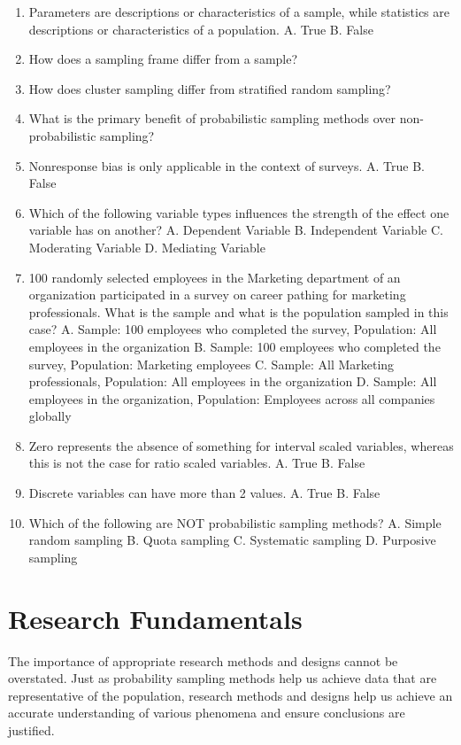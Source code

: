 \documentclass[]{book}
\begin{document}
\begin{enumerate}
\def\labelenumi{\arabic{enumi}.}
\item
  Parameters are descriptions or characteristics of a sample, while statistics are descriptions or characteristics of a population.
  A. True
  B. False
\item
  How does a sampling frame differ from a sample?
\item
  How does cluster sampling differ from stratified random sampling?
\item
  What is the primary benefit of probabilistic sampling methods over non-probabilistic sampling?
\item
  Nonresponse bias is only applicable in the context of surveys.
  A. True
  B. False
\item
  Which of the following variable types influences the strength of the effect one variable has on another?
  A. Dependent Variable
  B. Independent Variable
  C. Moderating Variable
  D. Mediating Variable
\item
  100 randomly selected employees in the Marketing department of an organization participated in a survey on career pathing for marketing professionals. What is the sample and what is the population sampled in this case?
  A. Sample: 100 employees who completed the survey, Population: All employees in the organization
  B. Sample: 100 employees who completed the survey, Population: Marketing employees
  C. Sample: All Marketing professionals, Population: All employees in the organization
  D. Sample: All employees in the organization, Population: Employees across all companies globally
\item
  Zero represents the absence of something for interval scaled variables, whereas this is not the case for ratio scaled variables.
  A. True
  B. False
\item
  Discrete variables can have more than 2 values.
  A. True
  B. False
\item
  Which of the following are NOT probabilistic sampling methods?
  A. Simple random sampling
  B. Quota sampling
  C. Systematic sampling
  D. Purposive sampling
\end{enumerate}

\hypertarget{research}{%
\chapter{Research Fundamentals}\label{research}}

The importance of appropriate research methods and designs cannot be overstated. Just as probability sampling methods help us achieve data that are representative of the population, research methods and designs help us achieve an accurate understanding of various phenomena and ensure conclusions are justified.
\end{document}

